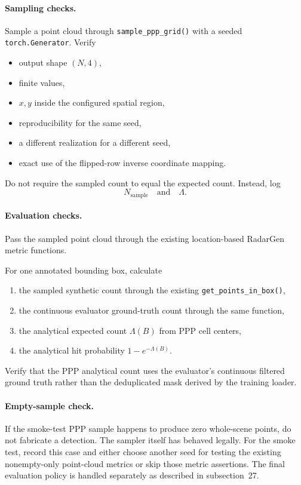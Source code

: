 \documentclass[11pt,a4paper]{article}
\begin{document}
\paragraph{Sampling checks.}
Sample a point cloud through \texttt{sample\_ppp\_grid()} with a seeded \texttt{torch.Generator}. Verify
\begin{itemize}
    \item output shape \((N,4)\),
    \item finite values,
    \item \(x,y\) inside the configured spatial region,
    \item reproducibility for the same seed,
    \item a different realization for a different seed,
    \item exact use of the flipped-row inverse coordinate mapping.
\end{itemize}

Do not require the sampled count to equal the expected count. Instead, log
\[
    N_{\mathrm{sample}}
    \quad\text{and}\quad
    \Lambda.
\]

\paragraph{Evaluation checks.}
Pass the sampled point cloud through the existing location-based RadarGen metric functions.

For one annotated bounding box, calculate
\begin{enumerate}[label=\arabic*.]
    \item the sampled synthetic count through the existing \texttt{get\_points\_in\_box()},
    \item the continuous evaluator ground-truth count through the same function,
    \item the analytical expected count \(\Lambda(B)\) from PPP cell centers,
    \item the analytical hit probability \(1-e^{-\Lambda(B)}\).
\end{enumerate}

Verify that the PPP analytical count uses the evaluator's continuous filtered ground truth rather than the deduplicated mask derived by the training loader.

\paragraph{Empty-sample check.}
If the smoke-test PPP sample happens to produce zero whole-scene points, do not fabricate a detection. The sampler itself has behaved legally. For the smoke test, record this case and either choose another seed for testing the existing nonempty-only point-cloud metrics or skip those metric assertions. The final evaluation policy is handled separately as described in subsection~27.
\end{document}
